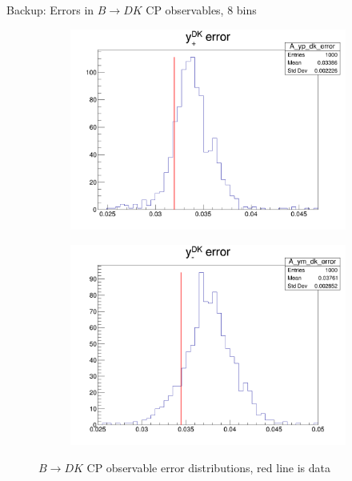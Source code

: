 \documentclass{beamer}
\begin{document}
\begin{frame}{Backup: Errors in $B\to DK$ CP observables, $8$ bins}
\begin{figure}
\begin{subfigure}{0.42\textwidth}
      \includegraphics[width = 1.0\textwidth]{A_yp_dk_8Bins_error.png}
    \end{subfigure}%
    \begin{subfigure}{0.42\textwidth}
      \includegraphics[width = 1.0\textwidth]{A_ym_dk_8Bins_error.png}
    \end{subfigure}
    \caption{$B\to DK$ CP observable error distributions, red line is data}
  \end{figure}
\end{frame}
\end{document}
